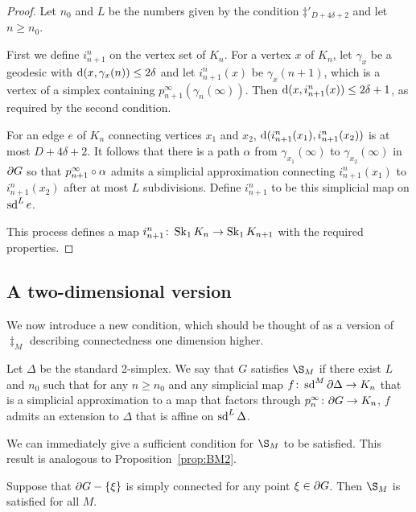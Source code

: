 \documentclass[a4paper]{article}
\begin{document}
\begin{proof}
  Let $n_0$ and $L$ be the numbers given by the condition $\ddag'_{D + 4\delta
  + 2}$ and let $n \geq n_0$.

  First we define $i^n_{n+1}$ on the vertex set of $K_n$. For a vertex $x$ of
  $K_n$, let $\gamma_x$ be a geodesic with $\operatorname{d}(x, \gamma_x(n)) \leq 2\delta$
  and let $i^n_{n+1}(x)$ be $\gamma_x(n+1)$, which is a vertex of a simplex
  containing $p^\infty_{n+1}(\gamma_n(\infty))$. Then $\operatorname{d}(x, i^n_{n+1}(x))
  \leq 2\delta + 1$, as required by the second condition.

  For an edge $e$ of $K_n$ connecting vertices $x_1$ and $x_2$,
  $\operatorname{d}(i^n_{n+1}(x_1), i^n_{n+1}(x_2))$ is at most $D + 4\delta + 2$. It
  follows that there is a path $\alpha$ from $\gamma_{x_1}(\infty)$ to
  $\gamma_{x_2}(\infty)$ in $\partial G$ so that
  $p^\infty_{n+1}\circ\alpha$ admits a simplicial approximation connecting
  $i^n_{n+1}(x_1)$ to $i^n_{n+1}(x_2)$ after at most $L$ subdivisions. Define
  $i^n_{n+1}$ to be this simplicial map on $\operatorname{sd}^L e$.

  This process defines a map $i^n_{n+1}\colon \operatorname{Sk}_1 K_n\to \operatorname{Sk}_1 K_{n+1}$
  with the required properties.
\end{proof}

\subsection{A two-dimensional version}

We now introduce a new condition, which should be thought of as a version of
$\ddag_M$ describing connectedness one dimension higher.

\begin{definition}
  Let $\Delta$ be the standard 2-simplex.  We say that $G$ satisfies $\S_M$ if
  there exist $L$ and $n_0$ such that for any $n\geq n_0$ and any simplicial
  map $f\colon \operatorname{sd}^M\partial\Delta \to K_n$ that is a simplicial approximation
  to a map that factors through $p^\infty_n \colon \partial G \to K_n$, $f$
  admits an extension to $\Delta$ that is affine on $\operatorname{sd}^L \Delta$.
\end{definition}

We can immediately give a sufficient condition for $\S_M$ to be satisfied. This
result is analogous to Proposition~\ref{prop:BM2}.

\begin{proposition}
  Suppose that $\partial G - \left\{\xi\right\}$ is simply connected for any point $\xi
  \in \partial G$. Then $\S_M$ is satisfied for all $M$.
\end{proposition}
\end{document}
